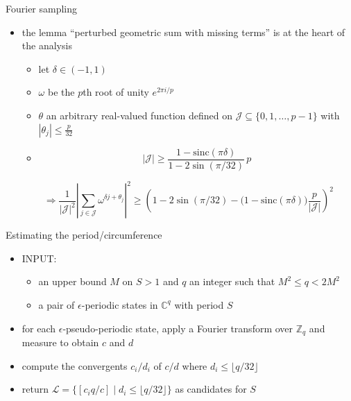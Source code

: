 \documentclass[slideColor]{prosper}
\newcommand{\Z}{\mathbb{Z}}
\newcommand{\C}{\mathbb C}
\renewcommand{\>}{\rangle}
\newcommand{\<}{\langle}
\begin{document}

\begin{slide}{Fourier sampling}
\vspace{-0.25cm}
\begin{itemize}
\item the lemma ``perturbed geometric sum with missing terms'' is at the heart of the analysis

\begin{itemize}
\item let $\delta\in(-1,1)$

\medskip
\item $\omega$ be the $p$th root of unity $e^{2\pi i/p}$

\medskip
\item $\theta$ an arbitrary real-valued function defined on $\mathcal{J} \subseteq \{0,1,\ldots,p-1\}$ with $|\theta_j|\le \frac{p}{32}$

\item {}
\[
|\mathcal{J}|\ge \frac{1-\mathrm{sinc}(\pi\delta)}{1-2\sin(\pi/32)}\, p
\]
\end{itemize}
\[
\!\!\!
\Rightarrow
\frac{1}{|\mathcal{J}|^2} \left| \sum_{j\in\mathcal{J}} \omega^{\delta j + \theta_j} \right|^2 \! \ge
\left(
1 - 2\sin(\pi/32) - \big(1-\mathrm{sinc}(\pi\delta)\big) \frac{p}{|\mathcal{J}|}
\right)^2
\]
\end{itemize}

\end{slide}


\begin{slide}{Estimating the period/circumference}

\begin{itemize}
\vspace{-0.4cm}
\item INPUT:

\begin{itemize}
\item an upper bound $M$ on $S>1$ and $q$ an integer such that $M^2\leq q< 2M^2$

\medskip
\item a pair of $\epsilon$-periodic states in $\C^q$ with period $S$
\end{itemize}

\bigskip
\item for each $\epsilon$-pseudo-periodic state,  apply a Fourier transform over $\Z_q$ and measure to obtain $c$ and $d$

\medskip
\item compute the convergents $c_i/d_i$ of $c/d$ where $d_i\leq  \lfloor q/32 \rfloor$

\medskip
\item return $\mathcal{L}= \Big\{ [c_iq/c] \mid d_i\leq \lfloor q/32 \rfloor \Big\}$ as candidates for $S$

\end{itemize}
\end{slide}
\end{document}
